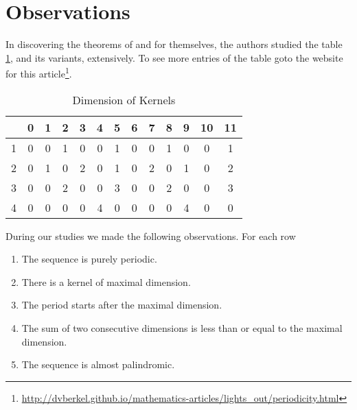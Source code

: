 \section{Observations}
In discovering the theorems of \cite{martin01} and \cite{leach17} for
themselves, the authors studied the table \ref{kernels}, and its variants,
extensively. To see more entries of the table goto the website for this
article\footnote{\url{http://dvberkel.github.io/mathematics-articles/lights_out/periodicity.html}}.

\begin{table}
  \begin{center}
    \begin{tabular}{|c|cccccccccccc|}
      \hline
        & \phantom{0}0 & \phantom{0}1 & \phantom{0}2 & \phantom{0}3 & \phantom{0}4 & \phantom{0}5 & \phantom{0}6 & \phantom{0}7 & \phantom{0}8 & \phantom{0}9 & 10 & 11 \\
      \hline
      \hline
      1 & 0            & 0            & 1            & 0            & 0            & 1            & 0            & 0            & 1            & 0            & 0  & 1  \\
      2 & 0            & 1            & 0            & 2            & 0            & 1            & 0            & 2            & 0            & 1            & 0  & 2  \\
      3 & 0            & 0            & 2            & 0            & 0            & 3            & 0            & 0            & 2            & 0            & 0  & 3  \\
      4 & 0            & 0            & 0            & 0            & 4            & 0            & 0            & 0            & 0            & 4            & 0  & 0  \\
      \hline
    \end{tabular}
  \end{center}
  \caption{Dimension of Kernels}\label{kernels}
\end{table}

During our studies we made the following observations. For each row

\begin{enumerate}
  \item \label{observation.periodic} The sequence is purely periodic.
  \item \label{observation.maximal} There is a kernel of maximal dimension.
  \item \label{observation.period} The period starts after the maximal dimension.
  \item \label{observation.consecutive} The sum of two consecutive dimensions is less than or equal to the maximal dimension.
  \item \label{observation.palindromic} The sequence is almost palindromic.
\end{enumerate}

